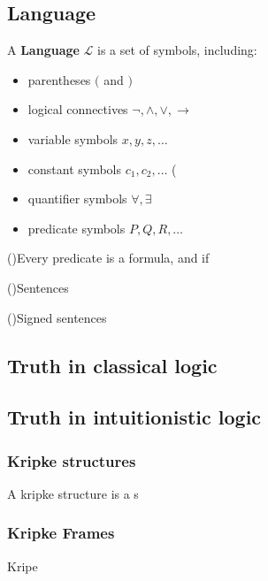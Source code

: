 \documentclass[runningheads]{llncs}
\begin{document}
\subsection{Language}
\begin{definition}
\item A \textbf{Language} $\mathcal{L}$ is a set of symbols, including:
\begin{itemize}
    \item parentheses $($ and $)$ 
    \item logical connectives $\neg,\land,\lor,\to$
    \item variable symbols $x,y,z,\ldots$
    \item constant symbols $c_{1},c_{2},\ldots$
   (%
    \item quantifier symbols $\forall,\exists$
    \item predicate symbols $P,Q,R,\ldots$
\end{itemize}

\end{definition}

()Every predicate is a formula, and if \a


()Sentences 


()Signed sentences
\subsection{Truth in classical logic}


\subsection{Truth in intuitionistic logic}


\subsubsection{Kripke structures} 

\begin{definition}
    A kripke structure is a s
\end{definition}

\subsubsection{Kripke Frames} 
\begin{definition}
    Kripe 
\end{definition}
\end{document}
